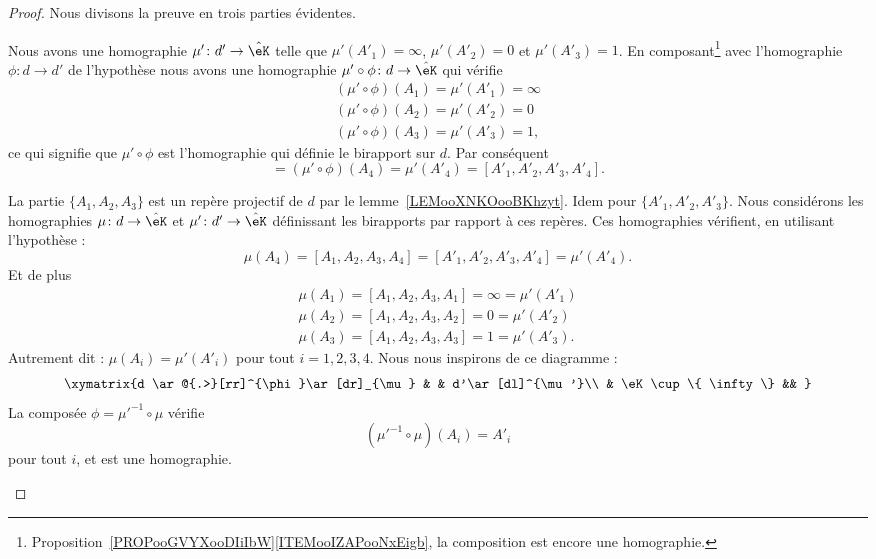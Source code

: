 \begin{proof}
	Nous divisons la preuve en trois parties évidentes.
	\begin{subproof}

		Nous avons une homographie \( \mu'\colon d'\to \hat\eK\) telle que \( \mu'(A'_1)=\infty\), \( \mu'(A'_2)=0\) et \( \mu'(A'_3)=1\). En composant\footnote{Proposition~\ref{PROPooGVYXooDIiIbW}\ref{ITEMooIZAPooNxEigb}, la composition est encore une homographie.} avec l'homographie \( \phi\colon d\to d'\) de l'hypothèse nous avons une homographie \( \mu'\circ \phi\colon d\to \hat\eK\) qui vérifie
		\begin{subequations}
			\begin{align}
				(\mu'\circ\phi)(A_1)=\mu'(A'_1)=\infty \\
				(\mu'\circ\phi)(A_2)=\mu'(A'_2)=0      \\
				(\mu'\circ\phi)(A_3)=\mu'(A'_3)=1,
			\end{align}
		\end{subequations}
		ce qui signifie que \( \mu'\circ\phi\) est l'homographie qui définie le birapport sur \( d\). Par conséquent
		\begin{equation}
			[A_1,A_2,A_3,A_4]=(\mu'\circ \phi)(A_4)=\mu'(A'_4)=[A'_1,A'_2,A'_3,A'_4].
		\end{equation}

		La partie \( \{ A_1,A_2,A_3 \}\) est un repère projectif de \( d\) par le lemme~\ref{LEMooXNKOooBKhzyt}. Idem pour \( \{ A'_1,A'_2,A'_3 \}\). Nous considérons les homographies \( \mu\colon d\to  \hat \eK\) et \( \mu'\colon d'\to \hat\eK\) définissant les birapports par rapport à ces repères. Ces homographies vérifient, en utilisant l'hypothèse :
		\begin{equation}
			\mu(A_4)=[A_1,A_2,A_3,A_4]=[A'_1,A'_2,A'_3,A'_4]=\mu'(A'_4).
		\end{equation}
		Et de plus
		\begin{subequations}
			\begin{align}
				\mu(A_1)=[A_1,A_2,A_3,A_1]=\infty=\mu'(A'_1) \\
				\mu(A_2)=[A_1,A_2,A_3,A_2]=0=\mu'(A'_2)      \\
				\mu(A_3)=[A_1,A_2,A_3,A_3]=1=\mu'(A'_3).
			\end{align}
		\end{subequations}
		Autrement dit : \( \mu(A_i)=\mu'(A'_i)\) pour tout \( i=1,2,3,4\). Nous nous inspirons de ce diagramme :
		\begin{equation}
			\xymatrix{%
				d \ar@{.>}[rr]^{\phi}\ar[dr]_{\mu}  &    &   d'\ar[dl]^{\mu'}\\
				&  \eK\cup\{ \infty \} &&
			}
		\end{equation}
		La composée \( \phi=\mu'^{-1}\circ\mu\) vérifie
		\begin{equation}
			(\mu'^{-1}\circ\mu)(A_i)=A'_i
		\end{equation}
		pour tout \( i\), et est une homographie.


\end{subproof}
\end{proof}

